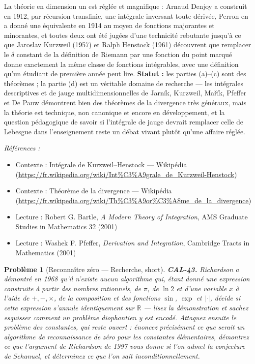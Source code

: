 \documentclass[11pt]{article}
\newtheorem{problem}{Problème}
\newenvironment{refs}{\par\small\noindent\emph{Références :}\begin{itemize}\setlength\itemsep{0pt}}{\end{itemize}\normalsize}
\begin{document}
\noindent La théorie en dimension un est réglée et magnifique : Arnaud Denjoy a construit en 1912, par
récursion transfinie, une intégrale inversant toute dérivée, Perron en a donné une équivalente
en 1914 au moyen de fonctions majorantes et minorantes, et toutes deux ont été jugées d'une technicité rebutante jusqu'à ce que
Jaroslav Kurzweil (1957) et Ralph Henstock (1961) découvrent que remplacer le $ \delta $ constant
de la définition de Riemann par une fonction du point marqué donne exactement la même classe
de fonctions intégrables, avec une définition qu'un étudiant de première année peut lire. \textbf{Statut :} les parties
(a)--(c) sont des théorèmes ; la partie (d) est un véritable domaine de recherche --- les intégrales descriptives et
de jauge multidimensionnelles de Jarník, Kurzweil, Ma\v{r}ík, Pfeffer et De Pauw démontrent bien des théorèmes de la
divergence très généraux, mais la théorie est technique, non canonique et encore en développement, et
la question pédagogique de savoir si l'intégrale de jauge devrait remplacer celle de Lebesgue dans l'enseignement
reste un débat vivant plutôt qu'une affaire réglée.

\begin{refs}
\item Contexte : Intégrale de Kurzweil--Henstock --- Wikipédia (\url{https://fr.wikipedia.org/wiki/Int%C3%A9grale_de_Kurzweil-Henstock})
\item Contexte : Théorème de la divergence --- Wikipédia (\url{https://fr.wikipedia.org/wiki/Th%C3%A9or%C3%A8me_de_la_divergence})
\item Lecture : Robert G. Bartle, \textit{A Modern Theory of Integration}, AMS Graduate Studies in Mathematics 32 (2001)
\item Lecture : Washek F. Pfeffer, \textit{Derivation and Integration}, Cambridge Tracts in Mathematics (2001)
\end{refs}

\bigskip

\begin{problem}[{Reconnaître zéro --- Recherche, short}]
\textbf{CAL-43.} Richardson a démontré en 1968 qu'il n'existe aucun algorithme qui,
étant donné une expression construite à partir des nombres rationnels, de $ \pi $, de $ \ln 2 $ et d'une variable
$ x $ à l'aide de $ +,-,\times $, de la composition et des fonctions $ \sin $, $ \exp $ et
$ |\cdot| $, décide si cette expression s'annule identiquement sur $ \mathbb{R} $ --- lisez la
démonstration et sachez esquisser comment un problème diophantien y est encodé. Attaquez ensuite le
problème des \textit{constantes}, qui reste ouvert : énoncez précisément ce que serait un algorithme de reconnaissance de zéro
pour les constantes élémentaires, démontrez ce que l'argument de Richardson de 1997 vous donne si l'on
admet la conjecture de Schanuel, et déterminez ce que l'on sait inconditionnellement.
\end{problem}
\end{document}
